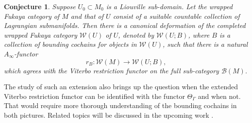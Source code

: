 \documentclass{amsart}
\newtheorem{conjecture}[theorem]{Conjecture}
\numberwithin{equation}{section}
\numberwithin{figure}{section}
\begin{document}
\begin{conjecture}\label{conjecture on extension of the Viterbo restriction functor}
	Suppose $U_{0} \subset M_{0}$ is a Liouville sub-domain. Let the wrapped Fukaya category of $M$ and that of $U$ consist of a suitable countable collection of Lagrangian submanifolds. Then there is a canonical deformation of the completed wrapped Fukaya category $\mathcal{W}(U)$ of $U$, denoted by $\mathcal{W}(U; B)$, where $B$ is a collection of bounding cochains for objects in $\mathcal{W}(U)$, such that there is a natural $A_{\infty}$-functor
\begin{equation*}
r_{B}: \mathcal{W}(M) \to \mathcal{W}(U; B),
\end{equation*}
which agrees with the Viterbo restriction functor on the full sub-category $\mathcal{B}(M)$.
\end{conjecture}

	The study of such an extension also brings up the question when the extended Viterbo restriction functor can be identified with the functor $\Theta_{\Gamma}$ and when not. That would require more thorough understanding of the bounding cochains in both pictures. Related topics will be discussed in the upcoming work \cite{Gao2}. \par





\end{document}
